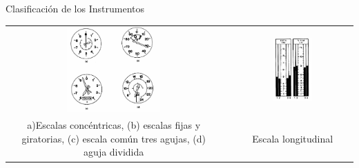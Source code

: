 \documentclass[10pt]{beamer}
\begin{document}
\begin{frame}{Clasificaci\'on de los Instrumentos}

  \begin{tabular}{ccc}
    \includegraphics[width=0.45\textwidth]{imagenes/1.2.clasificacion.instrumentos/escala_gran_alcance.png} & \hspace{3mm}
&     \includegraphics[width=0.35\textwidth]{imagenes/1.2.clasificacion.instrumentos/longitudinal.png}
\\
\parbox{0.45\textwidth}{a)Escalas conc\'entricas, (b) escalas fijas y giratorias, (c) escala com\'un tres agujas, (d) aguja dividida}
&
& Escala longitudinal
\\
  \end{tabular}

\end{frame}
\end{document}
